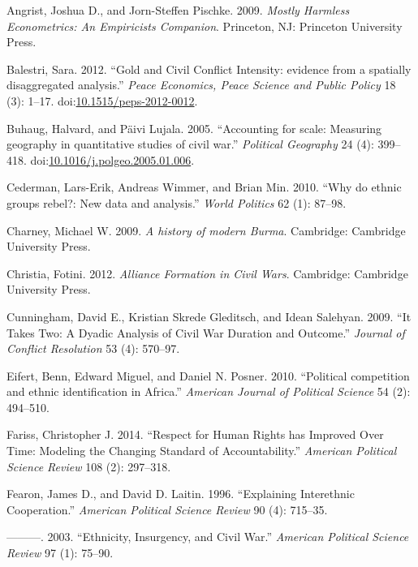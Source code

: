 \documentclass[12pt,]{book}
\theoremstyle{definition}
\theoremstyle{definition}
\theoremstyle{remark}
\begin{document}
\singlespacing

\hypertarget{refs}{}
\hypertarget{ref-Angrist2009}{}
Angrist, Joshua D., and Jorn-Steffen Pischke. 2009. \emph{Mostly
Harmless Econometrics: An Empiricists Companion}. Princeton, NJ:
Princeton University Press.

\hypertarget{ref-Balestri2012}{}
Balestri, Sara. 2012. ``Gold and Civil Conflict Intensity: evidence from
a spatially disaggregated analysis.'' \emph{Peace Economics, Peace
Science and Public Policy} 18 (3): 1--17.
doi:\href{https://doi.org/10.1515/peps-2012-0012}{10.1515/peps-2012-0012}.

\hypertarget{ref-Buhaug2005}{}
Buhaug, Halvard, and Päivi Lujala. 2005. ``Accounting for scale:
Measuring geography in quantitative studies of civil war.''
\emph{Political Geography} 24 (4): 399--418.
doi:\href{https://doi.org/10.1016/j.polgeo.2005.01.006}{10.1016/j.polgeo.2005.01.006}.

\hypertarget{ref-Cederman2010}{}
Cederman, Lars-Erik, Andreas Wimmer, and Brian Min. 2010. ``Why do
ethnic groups rebel?: New data and analysis.'' \emph{World Politics} 62
(1): 87--98.

\hypertarget{ref-Charney2009}{}
Charney, Michael W. 2009. \emph{A history of modern Burma}. Cambridge:
Cambridge University Press.

\hypertarget{ref-Christia2012}{}
Christia, Fotini. 2012. \emph{Alliance Formation in Civil Wars}.
Cambridge: Cambridge University Press.

\hypertarget{ref-Cunningham2009}{}
Cunningham, David E., Kristian Skrede Gleditsch, and Idean Salehyan.
2009. ``It Takes Two: A Dyadic Analysis of Civil War Duration and
Outcome.'' \emph{Journal of Conflict Resolution} 53 (4): 570--97.

\hypertarget{ref-Eifert2010}{}
Eifert, Benn, Edward Miguel, and Daniel N. Posner. 2010. ``Political
competition and ethnic identification in Africa.'' \emph{American
Journal of Political Science} 54 (2): 494--510.

\hypertarget{ref-Fariss2014}{}
Fariss, Christopher J. 2014. ``Respect for Human Rights has Improved
Over Time: Modeling the Changing Standard of Accountability.''
\emph{American Political Science Review} 108 (2): 297--318.

\hypertarget{ref-Fearon1996}{}
Fearon, James D., and David D. Laitin. 1996. ``Explaining Interethnic
Cooperation.'' \emph{American Political Science Review} 90 (4): 715--35.

\hypertarget{ref-fearonlaitin03}{}
---------. 2003. ``Ethnicity, Insurgency, and Civil War.''
\emph{American Political Science Review} 97 (1): 75--90.
\end{document}

